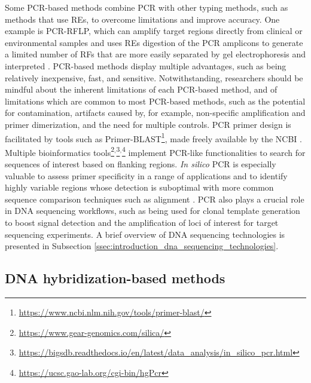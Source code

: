 Some \ac{PCR}-based methods combine \ac{PCR} with other typing methods, such as methods that use \ac{REs}, to overcome limitations and improve accuracy. One example is \ac{PCR}-\ac{RFLP}, which can amplify target regions directly from clinical or environmental samples and uses \ac{REs} digestion of the \ac{PCR} amplicons to generate a limited number of \ac{RFs} that are more easily separated by gel electrophoresis and interpreted \cite{wichelhaus_rapid_2001}.
\ac{PCR}-based methods display multiple advantages, such as being relatively inexpensive, fast, and sensitive. Notwithstanding, researchers should be mindful about the inherent limitations of each \ac{PCR}-based method, and of limitations which are common to most \ac{PCR}-based methods, such as the potential for contamination, artifacts caused by, for example, non-specific amplification and primer dimerization, and the need for multiple controls. \ac{PCR} primer design is facilitated by tools such as Primer-BLAST\footnote{\url{https://www.ncbi.nlm.nih.gov/tools/primer-blast/}}, made freely available by the \ac{NCBI} \cite{ye_primer-blast_2012}. Multiple bioinformatics tools\footnote{\url{https://www.gear-genomics.com/silica/}}$^{,}$\footnote{\url{https://bigsdb.readthedocs.io/en/latest/data_analysis/in_silico_pcr.html}}$^{,}$\footnote{\url{https://ucsc.gao-lab.org/cgi-bin/hgPcr}} implement \ac{PCR}-like functionalities to search for sequences of interest based on flanking regions. \textit{In silico} \ac{PCR} is especially valuable to assess primer specificity in a range of applications and to identify highly variable regions whose detection is suboptimal with more common sequence comparison techniques such as alignment \cite{kalendar_silico_2024}.
\ac{PCR} also plays a crucial role in \ac{DNA} sequencing workflows, such as being used for clonal template generation to boost signal detection and the amplification of loci of interest for target sequencing experiments. A brief overview of \ac{DNA} sequencing technologies is presented in Subsection \ref{ssec:introduction_dna_sequencing_technologies}.

\subsection{DNA hybridization-based methods}


